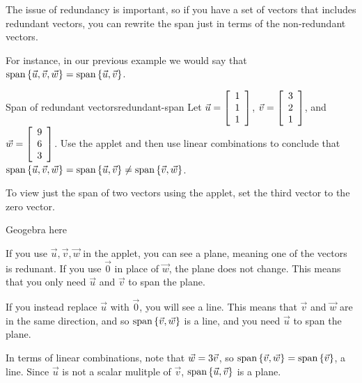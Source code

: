 \documentclass{ximera}
\begin{document}
\begin{exploration}
\begin{remark}
\begin{definition}
  \end{definition}

  The issue of redundancy is important, so if you have a set of vectors that includes redundant vectors, you can rewrite the span just in terms of the non-redundant vectors.

  For instance, in our previous example we would say that $\sspan\set{\vect{u},\vect{v},\vect{w}}=\sspan\set{\vect{u},\vect{v}}$.

\end{remark}

\begin{example}{Span of redundant vectors}{redundant-span}
  Let $\vect{u}=\startmat{r} 1 \\ 1 \\ 1 \stopmat$,
  $\vect{v}=\startmat{r} 3 \\ 2 \\ 1 \stopmat$, and
  $\vect{w}=\startmat{r} 9 \\ 6 \\ 3 \stopmat$.
  Use the applet and then use linear combinations to conclude that
  $\sspan\set{\vect{u},\vect{v},\vect{w}} =
  \sspan\set{\vect{u},\vect{v}}\neq\sspan\set{\vec{v},\vec{w}}$.
\end{example}

\begin{hint}

  To view just the span of two vectors using the applet, set the third vector to the zero vector. 

\end{hint}

\begin{center}
  Geogebra here
\end{center}


\begin{solution}
  
  If you use $\vec{u}, \vec{v}, \vec{w}$ in the applet, you can see a plane, meaning one of the vectors is redunant. If you use $\vec{0}$ in place of $\vec{w}$, the plane does not change. This means that you only need $\vec{u}$ and $\vec{v}$ to span the plane.
  
  If you instead replace $\vec{u}$ with $\vec{0}$, you will see a line. This means that $\vec{v}$ and $\vec{w}$ are in the same direction, and so $\sspan\set{\vec{v},\vec{w}}$ is a line, and you need $\vec{u}$ to span the plane.
  
  In terms of linear combinations, note that $\vect{w} = 3\vect{v}$, so $\sspan\set{\vec{v},\vec{w}}=\sspan\set{\vec{v}}$, a line. Since $\vec{u}$ is not a scalar mulitple of $\vec{v}$, $\sspan\set{\vec{u},\vec{v}}$ is a plane.
  
  
\end{solution}

\end{exploration}
\end{document}

